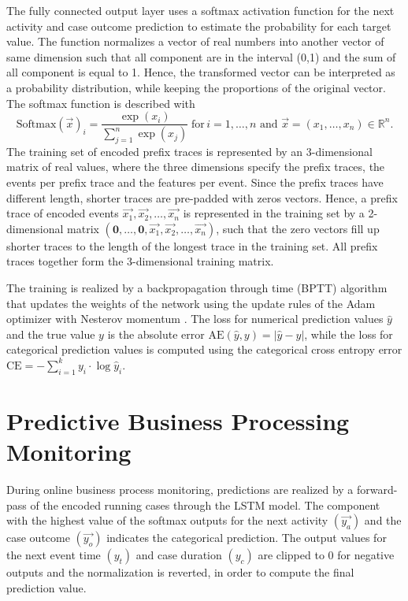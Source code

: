 The fully connected output layer uses a softmax activation function for the next activity and case outcome prediction to estimate the probability for each target value.
The function normalizes a vector of real numbers into another vector of same dimension such that all component are in the interval (0,1) and the sum of all component is equal to 1.
Hence, the transformed vector can be interpreted as a probability distribution, while keeping the proportions of the original vector.
The softmax function is described with
\begin{equation*}\label{key}
	\text{Softmax}(\vec{x})_i = \frac{\exp(x_i)}{\sum_{j=1}^{n} \exp(x_j)}  \; \text{for} \, i = 1, \dots, n \text{ and } \vec{x}=(x_1, \dots, x_n) \in \mathbb{R}^n.
\end{equation*}
The training set of encoded prefix traces is represented by an 3-dimensional matrix of real values, where the three dimensions specify the prefix traces, the events per prefix trace and the features per event.
Since the prefix traces have different length, shorter traces are pre-padded \cite{DBLP:journals/corr/abs-1903-07288} with zeros vectors.
Hence, a prefix trace of encoded events $\vec{x_1}, \vec{x_2}, \dots, \vec{x_n}$  is represented in the training set by a 2-dimensional matrix $(\mathbf{0}, \dots, \mathbf{0},\vec{x_1}, \vec{x_2}, \dots, \vec{x_n})$, such that the zero vectors fill up shorter traces to the length of the longest trace in the training set.
All prefix traces together form the 3-dimensional training matrix.

The training is realized by a backpropagation through time (BPTT) algorithm that updates the weights of the network using the update rules of the Adam optimizer with Nesterov momentum \cite{dozat2016incorporating}.
The loss for numerical prediction values $\hat{y}$ and the true value $y$ is the absolute error $\text{AE}(\hat{y},y)=|\hat{y} - y|$, while the loss for categorical prediction values is computed using the categorical cross entropy error $\text{CE} = - \sum_{i=1}^{k} y_i \cdot \log \hat{y}_i$.


\section{Predictive Business Processing Monitoring}

During online business process monitoring, predictions are realized by a forward-pass of the encoded running cases through the LSTM model.
The component with the highest value of the softmax outputs for the next activity $(\vec{y_a})$ and the case outcome $(\vec{y_o})$ indicates the categorical prediction.
The output values for the next event time $(y_t)$ and case duration  $(y_c)$ are clipped to 0 for negative outputs and the normalization is reverted, in order to compute the final prediction value.
